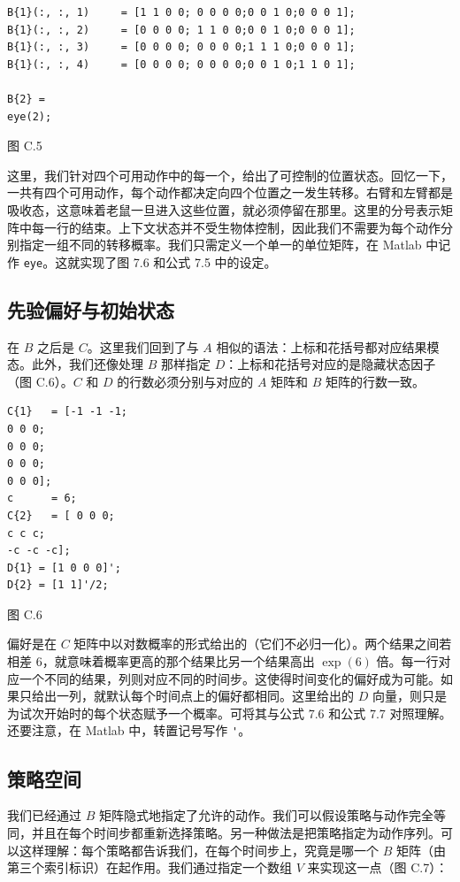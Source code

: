 \begin{verbatim}
B{1}(:, :, 1)     = [1 1 0 0; 0 0 0 0;0 0 1 0;0 0 0 1];
B{1}(:, :, 2)     = [0 0 0 0; 1 1 0 0;0 0 1 0;0 0 0 1];
B{1}(:, :, 3)     = [0 0 0 0; 0 0 0 0;1 1 1 0;0 0 0 1];
B{1}(:, :, 4)     = [0 0 0 0; 0 0 0 0;0 0 1 0;1 1 0 1];

B{2} =
eye(2);
\end{verbatim}

图 C.5

这里，我们针对四个可用动作中的每一个，给出了可控制的位置状态。回忆一下，一共有四个可用动作，每个动作都决定向四个位置之一发生转移。右臂和左臂都是吸收态，这意味着老鼠一旦进入这些位置，就必须停留在那里。这里的分号表示矩阵中每一行的结束。上下文状态并不受生物体控制，因此我们不需要为每个动作分别指定一组不同的转移概率。我们只需定义一个单一的单位矩阵，在 Matlab 中记作 \verb|eye|。这就实现了图 7.6 和公式 7.5 中的设定。

\subsection{先验偏好与初始状态}

在 $B$ 之后是 $C$。这里我们回到了与 $A$ 相似的语法：上标和花括号都对应结果模态。此外，我们还像处理 $B$ 那样指定 $D$：上标和花括号对应的是隐藏状态因子（图 C.6）。$C$ 和 $D$ 的行数必须分别与对应的 $A$ 矩阵和 $B$ 矩阵的行数一致。

\begin{verbatim}
C{1}   = [-1 -1 -1;
0 0 0;
0 0 0;
0 0 0;
0 0 0];
c      = 6;
C{2}   = [ 0 0 0;
c c c;
-c -c -c];
D{1} = [1 0 0 0]';
D{2} = [1 1]'/2;
\end{verbatim}

图 C.6

偏好是在 $C$ 矩阵中以对数概率的形式给出的（它们不必归一化）。两个结果之间若相差 6，就意味着概率更高的那个结果比另一个结果高出 $\exp(6)$ 倍。每一行对应一个不同的结果，列则对应不同的时间步。这使得时间变化的偏好成为可能。如果只给出一列，就默认每个时间点上的偏好都相同。这里给出的 $D$ 向量，则只是为试次开始时的每个状态赋予一个概率。可将其与公式 7.6 和公式 7.7 对照理解。还要注意，在 Matlab 中，转置记号写作 \verb|'|。

\subsection{策略空间}

我们已经通过 $B$ 矩阵隐式地指定了允许的动作。我们可以假设策略与动作完全等同，并且在每个时间步都重新选择策略。另一种做法是把策略指定为动作序列。可以这样理解：每个策略都告诉我们，在每个时间步上，究竟是哪一个 $B$ 矩阵（由第三个索引标识）在起作用。我们通过指定一个数组 $V$ 来实现这一点（图 C.7）：

